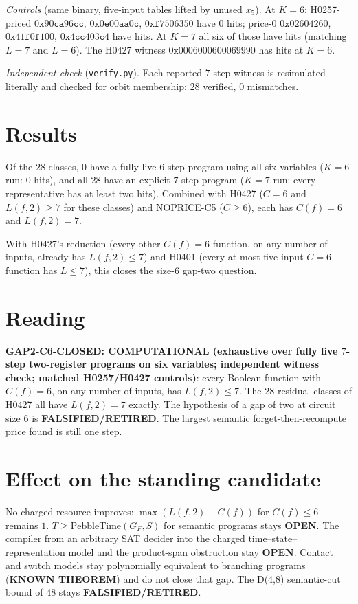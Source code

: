 \documentclass[11pt]{article}
\begin{document}
\emph{Controls} (same binary, five-input tables lifted by unused $x_5$). At $K=6$: H0257-priced $0\texttt{x}90\texttt{ca}96\texttt{cc}$, $0\texttt{x}0\texttt{e}00\texttt{aa}0\texttt{c}$, $0\texttt{x}\texttt{f}7506350$ have $0$ hits; price-0 $0\texttt{x}02604260$, $0\texttt{x}41\texttt{f}0\texttt{f}100$, $0\texttt{x}4\texttt{cc}403\texttt{c}4$ have hits. At $K=7$ all six of those have hits (matching $L=7$ and $L=6$). The H0427 witness $0\texttt{x}0006000600069990$ has hits at $K=6$.

\emph{Independent check} (\texttt{verify.py}). Each reported $7$-step witness is resimulated literally and checked for orbit membership: $28$ verified, $0$ mismatches.

\section*{Results}
Of the $28$ classes, $0$ have a fully live $6$-step program using all six variables ($K=6$ run: $0$ hits), and all $28$ have an explicit $7$-step program ($K=7$ run: every representative has at least two hits). Combined with H0427 ($C=6$ and $L(f,2)\ge7$ for these classes) and NOPRICE-C5 ($C\ge6$), each has $C(f)=6$ and $L(f,2)=7$.

With H0427's reduction (every other $C(f)=6$ function, on any number of inputs, already has $L(f,2)\le7$) and H0401 (every at-most-five-input $C=6$ function has $L\le7$), this closes the size-$6$ gap-two question.

\section*{Reading}
\textbf{GAP2-C6-CLOSED: COMPUTATIONAL (exhaustive over fully live $7$-step two-register programs on six variables; independent witness check; matched H0257/H0427 controls)}: every Boolean function with $C(f)=6$, on any number of inputs, has $L(f,2)\le7$. The $28$ residual classes of H0427 all have $L(f,2)=7$ exactly. The hypothesis of a gap of two at circuit size $6$ is \textbf{FALSIFIED/RETIRED}. The largest semantic forget-then-recompute price found is still one step.

\section*{Effect on the standing candidate}
No charged resource improves: $\max(L(f,2)-C(f))$ for $C(f)\le6$ remains $1$. $T\ge\mathrm{PebbleTime}(G_F,S)$ for semantic programs stays \textbf{OPEN}. The compiler from an arbitrary SAT decider into the charged time--state--representation model and the product-span obstruction stay \textbf{OPEN}. Contact and switch models stay polynomially equivalent to branching programs (\textbf{KNOWN THEOREM}) and do not close that gap. The D(4,8) semantic-cut bound of $48$ stays \textbf{FALSIFIED/RETIRED}.
\end{document}
